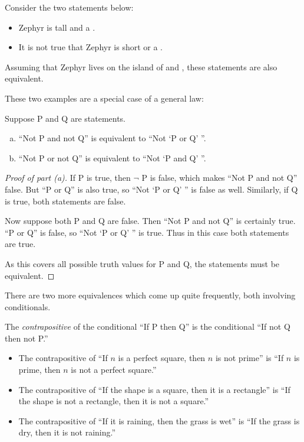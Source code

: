 \documentclass{tufte-book}
\begin{document}
\begin{example}
  Consider the two statements below:
  \begin{itemize}
      \item Zephyr is tall and a \knave.
      \item It is not true that Zephyr is short or a \knight.
  \end{itemize}
  Assuming that Zephyr lives on the island of \knights and \knaves, these statements are also equivalent.
\end{example}

These two examples are a special case of a general law:
\begin{theorem}
  Suppose P and Q are statements.
  \begin{enumerate}[(a)]
      \item ``Not P and not Q'' is equivalent to ``Not `P or Q' ''.
      \item ``Not P or not Q'' is equivalent to ``Not `P and Q' ''.
  \end{enumerate}
\end{theorem}

\begin{proof}[Proof of part (a)]
  If P is true, then $\neg$ P is false, which makes ``Not P and not Q'' false. But ``P or Q'' is also true, so ``Not `P or Q' '' is false as well. Similarly, if Q is true, both statements are false.

  Now suppose both P and Q are false. Then ``Not P and not Q'' is certainly true. ``P or Q'' is false, so ``Not `P or Q' '' is true. Thus in this case both statements are true.

  As this covers all possible truth values for P and Q, the statements must be equivalent.
\end{proof}

There are two more equivalences which come up quite frequently, both involving conditionals.

\begin{definition}
  The \emph{contrapositive} of the conditional ``If P then Q'' is the conditional ``If not Q then not P.''
\end{definition}

\begin{example}
  \begin{itemize}
      \item The contrapositive of ``If $n$ is a perfect square, then $n$ is not prime'' is ``If $n$ is prime, then $n$ is not a perfect square.''
      \item The contrapositive of ``If the shape is a square, then it is a rectangle'' is ``If the shape is not a rectangle, then it is not a square.''
      \item The contrapositive of ``If it is raining, then the grass is wet'' is ``If the grass is dry, then it is not raining.''
  \end{itemize}
\end{example}
\end{document}
